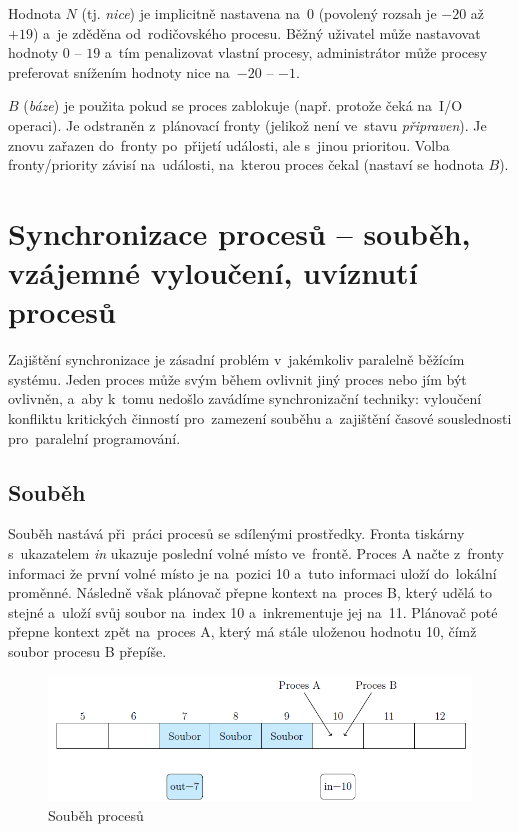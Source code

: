 Hodnota $N$ (tj. \emph{nice}) je implicitně nastavena na~0 (povolený rozsah je $-20$ až $+19$) a~je zděděna od~rodičovského procesu. Běžný uživatel může nastavovat hodnoty $0$ -- $19$ a~tím penalizovat vlastní procesy, administrátor může procesy preferovat snížením hodnoty nice na~$-20$ -- $-1$.

$B$ (\emph{báze}) je použita pokud se proces zablokuje (např. protože čeká na~I/O operaci). Je odstraněn z~plánovací fronty (jelikož není ve~stavu \emph{připraven}). Je znovu zařazen do~fronty po~přijetí události, ale s~jinou prioritou. Volba fronty/priority závisí na~události, na~kterou proces čekal (nastaví se hodnota $B$).

\clearpage
\section{Synchronizace procesů -- souběh, vzájemné vyloučení, uvíznutí procesů}
\label{sync}

Zajištění synchronizace je zásadní problém v~jakémkoliv paralelně běžícím systému. Jeden proces může svým během ovlivnit jiný proces nebo jím být ovlivněn, a~aby k~tomu nedošlo zavádíme synchronizační techniky: vyloučení konfliktu kritických činností pro~zamezení souběhu a~zajištění časové souslednosti pro~paralelní programování.

\subsection{Souběh}

Souběh nastává při~práci procesů se sdílenými prostředky. Fronta tiskárny s~ukazatelem \emph{in} ukazuje poslední volné místo ve~frontě. Proces A načte z~fronty informaci že první volné místo je na~pozici 10 a~tuto informaci uloží do~lokální proměnné. Následně však plánovač přepne kontext na~proces B, který udělá to stejné a~uloží svůj soubor na~index 10 a~inkrementuje jej na~11. Plánovač poté přepne kontext zpět na~proces A, který má stále uloženou hodnotu 10, čímž soubor procesu B přepíše.

\begin{figure}[ht]
	\centering
	\includegraphics[width=\textwidth]{images/proc_soubeh.png}
	\caption{Souběh procesů}
	\label{proc_soubeh}
\end{figure}

